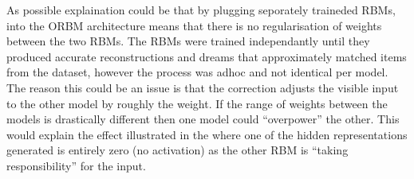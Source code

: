 As possible explaination could be that by plugging seporately traineded RBMs, into the ORBM architecture means that there is no regularisation of weights between the two RBMs. The RBMs were trained independantly until they produced accurate reconstructions and dreams that approximately matched items from the dataset, however the process was adhoc and not identical per model. The reason this could be an issue is that the correction adjusts the visible input to the other model by roughly the weight. If the range of weights between the models is drastically different then one model could ``overpower'' the other. This would explain the effect illustrated in the  where one of the hidden representations generated is entirely zero (no activation) as the other RBM is ``taking responsibility'' for the input.

